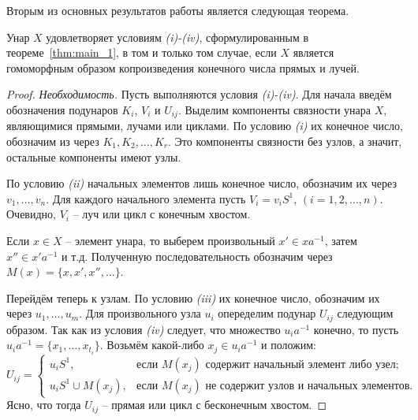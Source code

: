 \documentclass[11pt,twoside,final
]{article}
\begin{document}
Вторым из основных результатов работы является следующая теорема.
\begin{theorem} \label{thm:main_2}
	Унар $X$ удовлетворяет условиям \textit{(i)-(iv)}, сформулированным в теореме~\ref{thm:main_1}, в том и только том случае, если $X$ является гомоморфным образом копроизведения конечного числа прямых и лучей.
\end{theorem}
\begin{proof}
	\textit{Необходимость.}
	Пусть выполняются условия \textit{(i)-(iv)}.
	Для начала введём обозначения подунаров $K_i$, $V_i$ и $U_{ij}$.
	Выделим компоненты связности унара $X$, являющимися прямыми, лучами или циклами.
	По условию \textit{(i)} их конечное число, обозначим из через $K_1, K_2, \ldots, K_r$.
	Это компоненты связности без узлов, а значит, остальные компоненты имеют узлы.

	По условию \textit{(ii)} начальных элементов лишь конечное число, обозначим их через $v_1,\ldots, v_n$.
	Для каждого начального элемента пусть $V_i = v_i S^1$, $(i=1,2,\ldots,n)$.
	Очевидно, $V_i$ -- луч или цикл с конечным хвостом.

	Если $x \in X$ -- элемент унара, то выберем произвольный $x' \in x a^{-1}$, затем $x'' \in x' a^{-1}$ и т.д.
	Полученную последовательность обозначим через $M(x) = \{x, x', x'', \ldots \}$.

	Перейдём теперь к узлам.
	По условию \textit{(iii)} их конечное число, обозначим их через $u_1, \ldots, u_m$.
	Для произвольного узла $u_i$ опеределим подунар $U_{ij}$ следующим образом.
	Так как из условия \textit{(iv)} следует, что множество $u_i a^{-1}$ конечно, то пусть $u_i a^{-1} = \{ x_1, \ldots, x_{t_i} \}$.
	Возьмём какой-либо $x_j \in u_i a^{-1}$ и положим:
	\[
		U_{ij} =
		\begin{cases}
			u_i S^1,             & \text{если } M(x_j) \text{ содержит начальный элемент либо узел};    \\
			u_i S^1 \cup M(x_j), & \text{если } M(x_j) \text{ не содержит узлов и начальных элементов}.
		\end{cases}
	\]
	Ясно, что тогда $U_{ij}$ -- прямая или цикл с бесконечным хвостом.


\end{proof}
\end{document}
